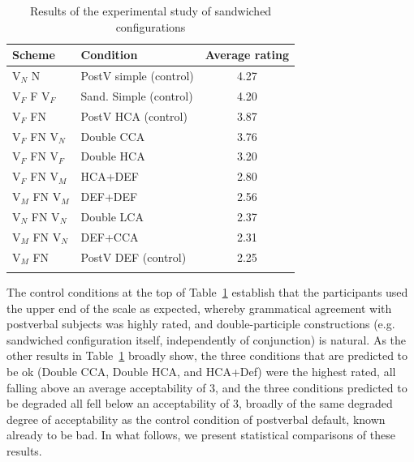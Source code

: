 \documentclass[output=paper
,modfonts
,nonflat]{langsci/langscibook}
\begin{document}
\begin{table}
\begin{tabularx}{\textwidth}{XXc}
	\lsptoprule
Scheme & Condition & Average rating \\ \midrule
V$_N$ N & PostV simple (control) & 4.27 \\ \midrule
V$_F$ F V$_F$ & Sand. Simple (control) & 4.20 \\ \midrule
V$_F$ FN & PostV HCA (control) & 3.87 \\ \midrule
V$_F$ FN V$_N$ & Double CCA & 3.76 \\ \midrule
V$_F$ FN V$_F$ & Double HCA & 3.20 \\ \midrule
V$_F$ FN V$_M$ & HCA+DEF & 2.80 \\ \midrule
V$_M$ FN V$_M$ & DEF+DEF & 2.56 \\ \midrule
V$_N$ FN V$_N$ & Double LCA & 2.37 \\ \midrule
V$_M$ FN V$_N$ & DEF+CCA & 2.31 \\ \midrule
V$_M$ FN & PostV DEF (control) & 2.25 \\ 
\lspbottomrule
\end{tabularx}
\caption{Results of the experimental study of sandwiched configurations}
\label{tab:results}
\end{table}
\newpage\noindent The control conditions at the top of Table~\ref{tab:results} establish that the participants used the upper end of the scale as expected, whereby grammatical agreement with postverbal subjects was highly rated, and double-participle constructions (e.g. sandwiched configuration itself, independently of conjunction) is natural. As the other results in Table~\ref{tab:results} broadly show, the three conditions that are predicted to be ok (Double CCA, Double HCA, and HCA+Def) were the highest rated, all falling above an average acceptability of 3, and the three conditions predicted to be degraded all fell below an acceptability of 3, broadly of the same degraded degree of acceptability as the control condition of postverbal default, known already to be bad. In what follows, we present statistical comparisons of these results. 


\end{document}
